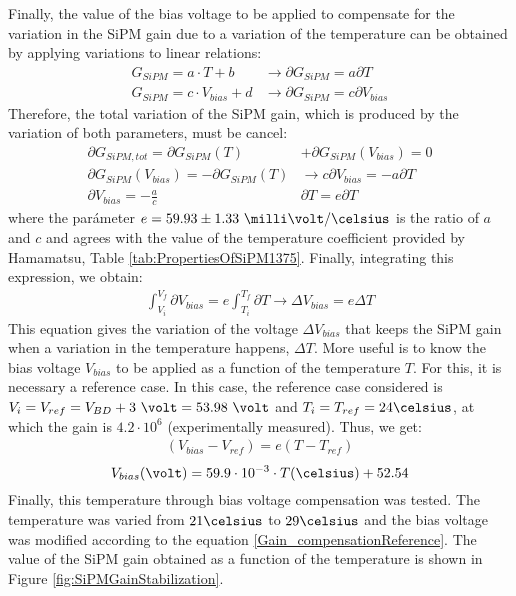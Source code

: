 Finally, the value of the bias voltage to be applied to compensate for the variation in the SiPM gain due to a variation of the temperature can be obtained by applying variations to linear relations:
\begin{equation*}
\begin{split}
G_{SiPM}=a \cdot{} T + b  &\longrightarrow \partial G_{SiPM}= a \partial T\\
G_{SiPM}=c \cdot{} V_{bias} + d &\longrightarrow \partial G_{SiPM}= c \partial V_{bias}
\label{Gain_compensationVariations}
\end{split}
\end{equation*} 
Therefore, the total variation of the SiPM gain, which is produced by the variation of both parameters, must be cancel:
\begin{equation*}
\begin{split}
\partial G_{SiPM, tot}= \partial G_{SiPM}(T) &+ \partial G_{SiPM}(V_{bias}) = 0\\ 
\partial G_{SiPM}(V_{bias}) = -\partial G_{SiPM}(T) &\longrightarrow c \partial V_{bias} = - a \partial T\\ 
\partial V_{bias}  = - \frac{a}{c}&\partial T = e \partial T
\label{Gain_compensation0}
\end{split}
\end{equation*} 
where the parámeter $e= 59.93 \pm 1.33~\milli\volt/\celsius $ is the ratio of $a$ and $c$ and agrees with the value of the temperature coefficient provided by Hamamatsu, Table \ref{tab:PropertiesOfSiPM1375}. Finally, integrating this expression, we obtain:
\begin{equation}
\begin{split}
\int_{V_i}^{V_f}\partial V_{bias}  = e\int_{T_i}^{T_f}\partial T \longrightarrow \Delta V_{bias} = e \Delta T
\label{Gain_compensationIntegring}
\end{split}
\end{equation} 
This equation gives the variation of the voltage $\Delta V_{bias}$ that keeps the SiPM gain when a variation in the temperature happens, $\Delta T$. More useful is to know the bias voltage $V_{bias}$ to be applied as a function of the temperature $T$. For this, it is necessary a reference case. In this case, the reference case considered is $V_i=V_{ref}= V_{BD}+3~\volt = 53.98~\volt$ and $T_i=T_{ref}=24\celsius$, at which the gain is $4.2 \cdot{} 10^{6}$ (experimentally measured). Thus, we get:
\begin{equation*}
\begin{split}
(V_{bias}-V_{ref} )= e \left( T -T_{ref} \right) 
\label{Gain_compensationEquation}
\end{split}
\end{equation*}
\begin{equation}
V_{bias}(\volt)= 59.9 \cdot{} 10^{-3} \cdot{} T(\celsius) + 52.54
\label{Gain_compensationReference}
\end{equation}  
Finally, this temperature through bias voltage compensation was tested. The temperature was varied from $21\celsius$ to $29\celsius$ and the bias voltage was modified according to the equation \ref{Gain_compensationReference}. The value of the SiPM gain obtained as a function of the temperature is shown in Figure \ref{fig:SiPMGainStabilization}.

